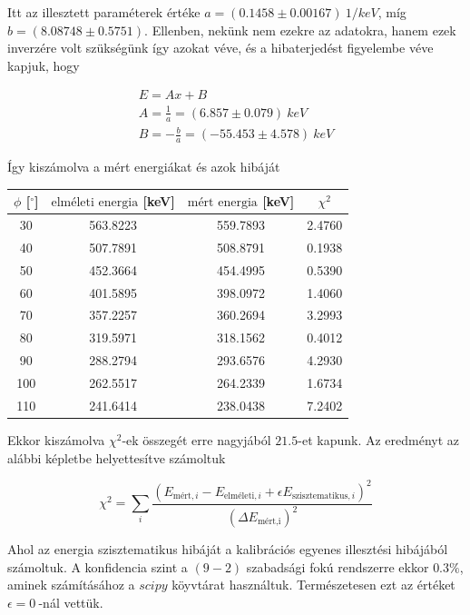 \documentclass[a4paper,12pt]{article}
\begin{document}
\par Itt az illesztett paraméterek értéke $a = (0.1458 \pm 0.00167) ~{1/keV}$, míg $b = (8.08748 \pm 0.5751)$. Ellenben, nekünk nem ezekre az adatokra, hanem ezek inverzére volt szükségünk így azokat véve, és a hibaterjedést figyelembe véve kapjuk, hogy

\begin{gather*}
	E = A x + B \\
	A = \frac{1}{a} = (6.857 \pm 0.079) ~keV \\
	B = -\frac{b}{a} = (-55.453 \pm 4.578) ~keV
\end{gather*}

\par Így kiszámolva a mért energiákat és azok hibáját

\begin{center}
\begin{tabular}{|c| c| c| c|}\hline
$\phi$ [$^{\circ}$] & $\text{elméleti energia}$ [keV] & $\text{mért energia}$ [keV] & $\chi^{2}$ \\ \hline
30 & 563.8223 & 559.7893&2.4760 \\ \hline
40 &507.7891 &508.8791&0.1938 \\ \hline
50 &452.3664 &454.4995&0.5390\\ \hline
60&401.5895 &398.0972&1.4060\\ \hline
70&357.2257 &360.2694&3.2993\\ \hline
80& 319.5971&318.1562&0.4012\\ \hline
90& 288.2794&293.6576&4.2930\\ \hline
100&262.5517 &264.2339&1.6734\\ \hline
110&241.6414 &238.0438&7.2402\\ \hline
\end{tabular}
\end{center}

\par Ekkor kiszámolva $\chi^{2}$-ek összegét erre nagyjából $21.5$-et kapunk. Az eredményt az alábbi képletbe helyettesítve számoltuk

\begin{equation*}
	\chi^{2} = \sum_{i}\frac{(E_{\text{mért}, i} - E_{\text{elméleti}, i} + \epsilon E_{\text{szisztematikus} , i})^{2}}{(\Delta E_{\text{mért,i}})^{2}}
\end{equation*}

\par Ahol az energia szisztematikus hibáját a kalibrációs egyenes illesztési hibájából számoltuk. A konfidencia szint a $(9-2)$ szabadsági fokú rendszerre ekkor $0.3\%$, aminek számításához a $scipy$ köyvtárat használtuk. Természetesen ezt az értéket $\epsilon = 0~$-nál vettük.
\end{document}
